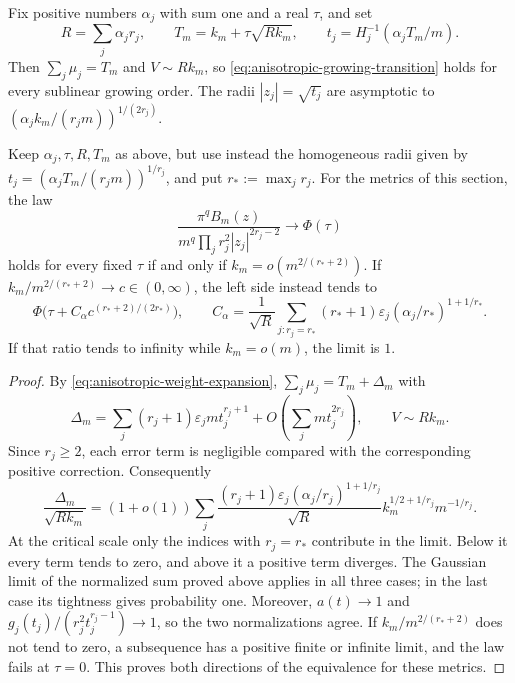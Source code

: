 Fix positive numbers $\alpha_j$ with sum one and a real $\tau$, and set
\begin{equation}\label{eq:anisotropic-corrected-radii}
 R=\sum_j\alpha_jr_j,\qquad T_m=k_m+\tau\sqrt{Rk_m},\qquad
 t_j=H_j^{-1}(\alpha_jT_m/m).
\end{equation}
Then $\sum_j\mu_j=T_m$ and $V\sim Rk_m$, so \eqref{eq:anisotropic-growing-transition} holds for every sublinear growing order. The radii $|z_j|=\sqrt{t_j}$ are asymptotic to $(\alpha_jk_m/(r_jm))^{1/(2r_j)}$.

\begin{proposition}\label{prop:anisotropic-homogeneous-center}
Keep $\alpha_j,\tau,R,T_m$ as above, but use instead the homogeneous radii given by $t_j=(\alpha_jT_m/(r_jm))^{1/r_j}$, and put $r_*:=\max_jr_j$. For the metrics of this section, the law
\[
 \frac{\pi^qB_m(z)}{m^q\prod_jr_j^2|z_j|^{2r_j-2}}\longrightarrow\Phi(\tau)
\]
holds for every fixed $\tau$ if and only if $k_m=o(m^{2/(r_*+2)})$. If $k_m/m^{2/(r_*+2)}\to c\in(0,\infty)$, the left side instead tends to
\[
 \Phi\bigl(\tau+C_\alpha c^{(r_*+2)/(2r_*)}\bigr),\qquad
 C_\alpha=\frac1{\sqrt R}\sum_{j:r_j=r_*}
 (r_*+1)\varepsilon_j(\alpha_j/r_*)^{1+1/r_*}.
\]
If that ratio tends to infinity while $k_m=o(m)$, the limit is $1$.
\end{proposition}
\begin{proof}
By \eqref{eq:anisotropic-weight-expansion}, $\sum_j\mu_j=T_m+\Delta_m$ with
\[
 \Delta_m=\sum_j(r_j+1)\varepsilon_jmt_j^{r_j+1}
                    +O\left(\sum_jmt_j^{2r_j}\right),\qquad V\sim Rk_m.
\]
Since $r_j\geq2$, each error term is negligible compared with the corresponding positive correction. Consequently
\[
 \frac{\Delta_m}{\sqrt{Rk_m}}=(1+o(1))\sum_j
 \frac{(r_j+1)\varepsilon_j(\alpha_j/r_j)^{1+1/r_j}}{\sqrt R}
 k_m^{1/2+1/r_j}m^{-1/r_j}.
\]
At the critical scale only the indices with $r_j=r_*$ contribute in the limit. Below it every term tends to zero, and above it a positive term diverges. The Gaussian limit of the normalized sum proved above applies in all three cases; in the last case its tightness gives probability one. Moreover, $a(t)\to1$ and $g_j(t_j)/(r_j^2t_j^{r_j-1})\to1$, so the two normalizations agree. If $k_m/m^{2/(r_*+2)}$ does not tend to zero, a subsequence has a positive finite or infinite limit, and the law fails at $\tau=0$. This proves both directions of the equivalence for these metrics.
\end{proof}


